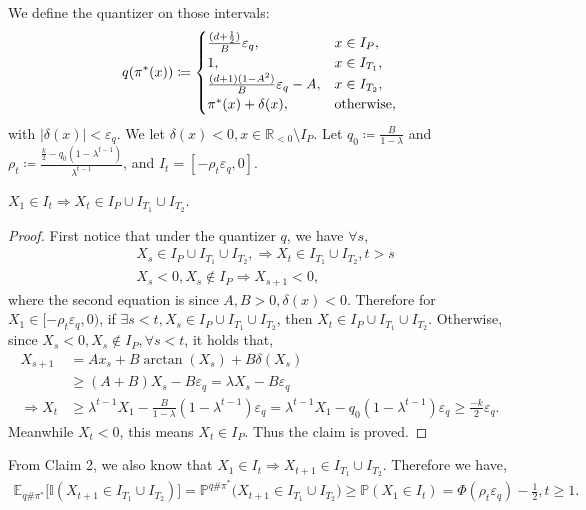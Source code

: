 \documentclass{article}
\begin{document}
    
    We define the quantizer on those intervals:
    \begin{equation*}
        q(\pi^*(x))\coloneqq \begin{cases}
            \frac{(d+\frac{1}{2})}{B}\varepsilon_q, &x\in I_P,\\
            1, & x\in I_{T_1},\\
            \frac{(d+1)(1-A^2)}{B}\varepsilon_q-A, &x\in I_{T_2},\\
            \pi^*(x)+\delta(x), &\textnormal{otherwise},
        \end{cases}
    \end{equation*}
    with $|\delta(x)|<\varepsilon_q$. We let $\delta(x)< 0, x\in \mathbb R_{<0}\setminus I_P$. Let $q_0\coloneqq \frac{B}{1-\lambda}$ and
    $\rho_t \coloneqq  \frac{\frac{k}{2}-q_0(1-\lambda^{t-1})}{\lambda^{t-1}}$, and $I_t = [-\rho_t\varepsilon_q, 0]$. 
    \begin{claim}
        $X_1\in I_t\Rightarrow X_t\in I_P\cup I_{T_1}\cup I_{T_2}$.
    \end{claim}
    \begin{proof}
    First notice that under the quantizer $q$, we have $\forall s$,
    \begin{align*}
        &X_s\in I_P\cup I_{T_1}\cup I_{T_2}, \Rightarrow X_t\in I_{T_1}\cup I_{T_2}, t>s\\
        &X_s <0, X_s\notin I_P\Rightarrow X_{s+1}<0,
    \end{align*}
    where the second equation is since $A, B>0, \delta(x)<0$. Therefore for $X_1\in [-\rho_t\varepsilon_q, 0)$, if $\exists s<t, X_s\in I_P\cup I_{T_1}\cup I_{T_2}$, then $X_t\in I_P\cup I_{T_1}\cup I_{T_2}$. Otherwise, since $X_s<0, X_s\notin I_P, \forall s<t$, it holds that,
    \begin{align*}
        X_{s+1}&=Ax_s+B\arctan(X_s)+B\delta(X_s)\\
        &\geq (A+B)X_s-B\varepsilon_q=\lambda X_s-B\varepsilon_q\\
        \Rightarrow X_t&\geq \lambda ^{t-1} X_1-\frac{B}{1-\lambda}(1-\lambda^{t-1})\varepsilon_q=\lambda^{t-1}X_1-q_0(1-\lambda^{t-1})\varepsilon_q\geq \frac{-k}{2}\varepsilon_q.
    \end{align*}
    Meanwhile $X_t<0$, this means $X_t\in I_P$. Thus the claim is proved.
    \end{proof}

    From Claim 2, we also know that $X_1\in I_t\Rightarrow X_{t+1}\in I_{T_1}\cup I_{T_2}$. Therefore we have,
    \begin{align*}
        \mathbb{E}_{q\#\pi^*}\bigl[\mathbb{I}(X_{t+1}\in I_{T_1}\cup I_{T_2})\bigr]
=
\mathbb{P}^{q\#\pi^*}\bigl(X_{t+1}\in I_{T_1}\cup I_{T_2}\bigr)
\geq
\mathbb{P}(X_1\in I_t)
=
\Phi(\rho_t\varepsilon_q)-\tfrac{1}{2},
t\geq 1.
    \end{align*}
\end{document}
